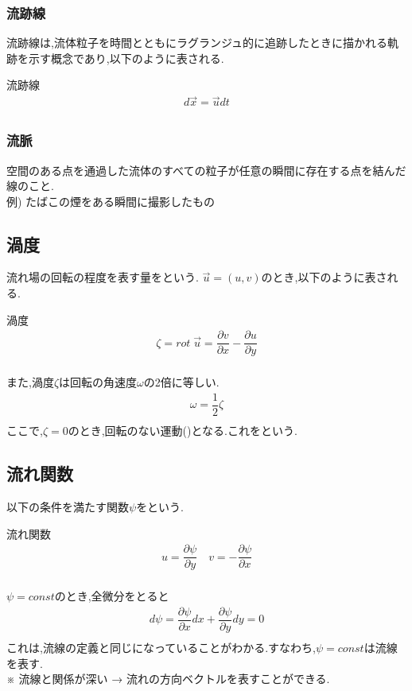 \documentclass[a4paper]{jsarticle}
\begin{document}
\subsubsection{流跡線}
流跡線は,流体粒子を時間とともにラグランジュ的に追跡したときに描かれる軌跡を示す概念であり,以下のように表される.
\begin{itembox}[l]{流跡線}
    \begin{eqnarray*}
        d\vec{x}=\vec{u}dt\\
    \end{eqnarray*}
\end{itembox}
\subsubsection{流脈}
空間のある点を通過した流体のすべての粒子が任意の瞬間に存在する点を結んだ線のこと.\\
例) たばこの煙をある瞬間に撮影したもの
\subsection{渦度}
流れ場の回転の程度を表す量をという.
$\vec{u}=\left(u,v\right)$のとき,以下のように表される.
\begin{itembox}[l]{渦度}
    \begin{eqnarray*}
        \zeta = rot\;\vec{u}=\dfrac{\partial v}{\partial x}-\dfrac{\partial u}{\partial y}\\
    \end{eqnarray*}
\end{itembox}
また,渦度$\zeta$は回転の角速度$\omega$の2倍に等しい.
\begin{eqnarray*}
    \omega = \dfrac{1}{2}\zeta\\
\end{eqnarray*}
ここで,$\zeta=0$のとき,回転のない運動()となる.これをという.
\subsection{流れ関数}
以下の条件を満たす関数$\psi$をという.
\begin{itembox}[l]{流れ関数}
    \begin{eqnarray*}
        u=\dfrac{\partial \psi}{\partial y}\quad v=-\dfrac{\partial \psi}{\partial x}\\
    \end{eqnarray*}
\end{itembox}
$\psi =const$のとき,全微分をとると\\
\begin{eqnarray*}
    d\psi = \dfrac{\partial \psi}{\partial x}dx+\dfrac{\partial \psi}{\partial y}dy=0\\
\end{eqnarray*}
これは,流線の定義と同じになっていることがわかる.すなわち,$\psi = const$は流線を表す.\\
※ 流線と関係が深い → 流れの方向ベクトルを表すことができる.
\end{document}
